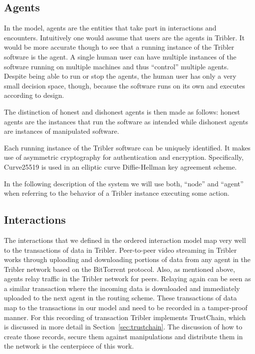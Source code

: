 \subsection{Agents}
In the model, agents are the entities that take part in interactions and encounters. Intuitively one
would assume that users are the agents in Tribler. It would be more accurate though to see that a 
running instance of the Tribler software is the agent. A single human user can have multiple 
instances of the software running on multiple machines and thus ``control'' multiple agents. Despite
being able to run or stop the agents, the human user has only a very small decision space, though, 
because the software runs on its own and executes according to design. 

The distinction of honest and dishonest agents is then made as follows: honest agents are the 
instances that run the software as intended while dishonest agents are instances of manipulated 
software. 

Each running instance of the Tribler software can be uniquely identified. It makes use of asymmetric
cryptography for authentication and encryption. Specifically, Curve25519 is used in an 
elliptic curve Diffie-Hellman key agreement scheme. 

In the following description of the system we will use both, ``node'' and ``agent'' when referring to the 
behavior of a Tribler instance executing some action. 

\subsection{Interactions}
The interactions that we defined in the ordered interaction model map very well to the transactions
of data in Tribler. Peer-to-peer video streaming in Tribler works through uploading and downloading 
portions of data from any agent in the Tribler network based on the BitTorrent protocol. Also, as
mentioned above, agents relay traffic in the Tribler network for peers. Relaying again can be seen 
as a similar transaction where the incoming data is downloaded and immediately uploaded to the next
agent in the routing scheme. These transactions of data map to the transactions in our model and 
need to be recorded in a tamper-proof manner. For this recording of transaction Tribler implements 
TrustChain, which is discussed in 
more detail in Section~\ref{sec:trustchain}. The discussion of how to create those records, secure 
them against manipulations and distribute them in the network is the centerpiece of this work.

